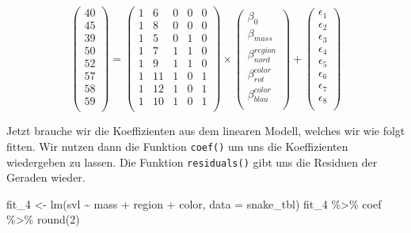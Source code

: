 \documentclass[
  letterpaper,
]{scrbook}
\newenvironment{Shaded}{\begin{snugshade}}{\end{snugshade}}
\newcommand{\AttributeTok}[1]{\textcolor[rgb]{0.40,0.45,0.13}{#1}}
\newcommand{\DecValTok}[1]{\textcolor[rgb]{0.68,0.00,0.00}{#1}}
\newcommand{\FunctionTok}[1]{\textcolor[rgb]{0.28,0.35,0.67}{#1}}
\newcommand{\NormalTok}[1]{\textcolor[rgb]{0.00,0.23,0.31}{#1}}
\newcommand{\OtherTok}[1]{\textcolor[rgb]{0.00,0.23,0.31}{#1}}
\newcommand{\SpecialCharTok}[1]{\textcolor[rgb]{0.37,0.37,0.37}{#1}}
\begin{document}
\[
 \begin{pmatrix}
  40 \\
  45 \\
  39 \\
  50 \\
  52 \\
  57 \\
  58 \\
  59 \\
 \end{pmatrix}
 =
  \begin{pmatrix}
  1 & 6 & 0 & 0 & 0 \\
  1 & 8 & 0 & 0 & 0\\
  1 & 5 & 0 & 1 & 0\\
  1 & 7 & 1 & 1 & 0\\
  1 & 9 & 1 & 1 & 0\\
  1 & 11& 1 & 0 & 1\\
  1 & 12& 1 & 0 & 1\\
  1 & 10& 1 & 0 & 1\\
 \end{pmatrix}
 \times
  \begin{pmatrix}
  \beta_0 \\
  \beta_{mass} \\
  \beta^{region}_{nord} \\
  \beta^{color}_{rot} \\
  \beta^{color}_{blau} \\
 \end{pmatrix} +
  \begin{pmatrix}
  \epsilon_1 \\
  \epsilon_2 \\
  \epsilon_3 \\
  \epsilon_4 \\
  \epsilon_5 \\
  \epsilon_6 \\
  \epsilon_7 \\
  \epsilon_8 \\
 \end{pmatrix}
\]

Jetzt brauche wir die Koeffizienten aus dem linearen Modell, welches wir
wie folgt fitten. Wir nutzen dann die Funktion \texttt{coef()} um uns
die Koeffizienten wiedergeben zu lassen. Die Funktion
\texttt{residuals()} gibt uns die Residuen der Geraden wieder.

\begin{Shaded}
\begin{Highlighting}[]
\NormalTok{fit\_4 }\OtherTok{\textless{}{-}} \FunctionTok{lm}\NormalTok{(svl }\SpecialCharTok{\textasciitilde{}}\NormalTok{ mass }\SpecialCharTok{+}\NormalTok{ region }\SpecialCharTok{+}\NormalTok{ color, }\AttributeTok{data =}\NormalTok{ snake\_tbl) }
\NormalTok{fit\_4 }\SpecialCharTok{\%\textgreater{}\%}\NormalTok{ coef }\SpecialCharTok{\%\textgreater{}\%} \FunctionTok{round}\NormalTok{(}\DecValTok{2}\NormalTok{)}
\end{Highlighting}
\end{Shaded}
\end{document}
